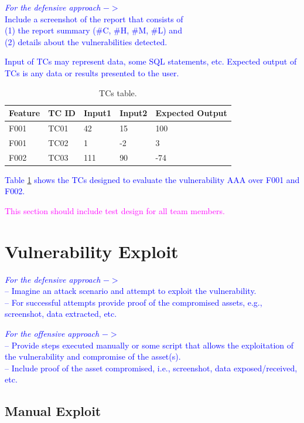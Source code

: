 \documentclass{article}
\begin{document}
\textcolor{blue}{\textit{For the defensive approach} $->$\\
Include a screenshot of the report that consists of \\
(1) the report summary (\#C, \#H, \#M, \#L) and \\
(2) details about the vulnerabilities detected.}

\textcolor{blue}{Input of TCs may represent data, some SQL statements, etc. Expected output of TCs is any data or results presented to the user.}

\begin{table} [htpb]
\centering
\begin{tabular}{l|l|l|l|l}
Feature & TC ID & Input1 & Input2 & Expected Output \\ \hline
F001  &TC01 & 42 & 15 & 100\\
F001  &TC02 & 1 & -2 & 3\\
F002  &TC03 & 111 & 90 & -74
\end{tabular}
\caption{\label{tab:TCs1}TCs table.}
\end{table}

\textcolor{blue}{Table \ref{tab:TCs1} shows the TCs designed to evaluate the vulnerability AAA over F001 and F002.}


\textcolor{magenta}{This section should include test design for all team members.}


\section{Vulnerability Exploit}
\label{}

\textcolor{blue}{\textit{For the defensive approach} $->$\\
-- Imagine an attack scenario and attempt to exploit the vulnerability.\\
-- For successful attempts provide proof of the compromised assets, e.g., screenshot, data extracted, etc.}

\textcolor{blue}{\textit{For the offensive approach} $->$\\
-- Provide steps executed manually or some script that allows the exploitation of the vulnerability and compromise of the asset(s).\\
-- Include proof of the asset compromised, i.e., screenshot, data exposed/received, etc. }


\subsection{Manual Exploit}
\label{}
\end{document}
